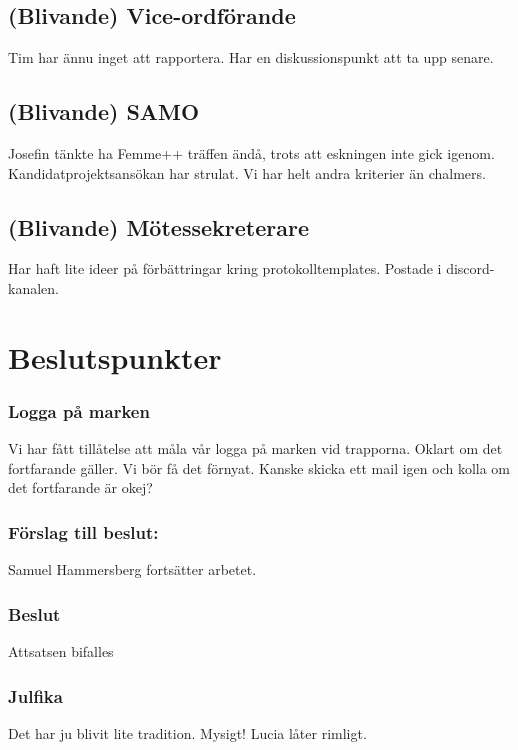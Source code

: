 \documentclass[protokoll]{dvd}
\begin{document}
\subsection{(Blivande) Vice-ordförande}
Tim har ännu inget att rapportera.
Har en diskussionspunkt att ta upp senare.

\subsection{(Blivande) SAMO}
Josefin tänkte ha Femme++ träffen ändå, trots att eskningen inte gick igenom.
Kandidatprojektsansökan har strulat. Vi har helt andra kriterier än chalmers.

\subsection{(Blivande) Mötessekreterare}
Har haft lite ideer på förbättringar kring protokolltemplates. Postade i discord-kanalen.

\newpage

\section{Beslutspunkter}

\subsubsection*{Logga på marken}
Vi har fått tillåtelse att måla vår logga på marken vid trapporna. Oklart om det fortfarande gäller. Vi bör få det förnyat.
Kanske skicka ett mail igen och kolla om det fortfarande är okej?
\subsubsection*{Förslag till beslut:}
\begin{attsatser}
    \item Samuel Hammersberg fortsätter arbetet.
\end{attsatser}

\subsubsection*{Beslut}
\begin{attsatser}
    \item Attsatsen bifalles
\end{attsatser}


\subsubsection*{Julfika}
Det har ju blivit lite tradition. Mysigt! Lucia låter rimligt.
\end{document}
